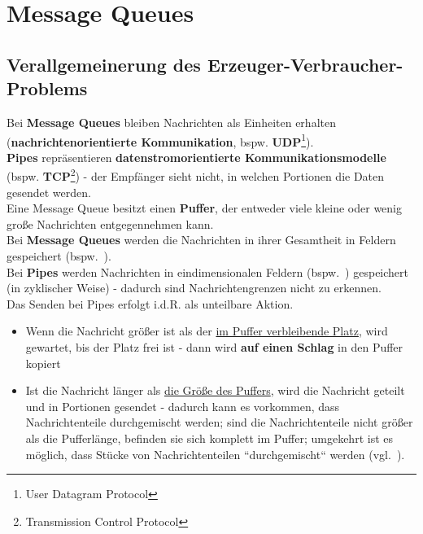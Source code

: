 \section{Message Queues}\label{sec:messagequeues}

\subsection{Verallgemeinerung des Erzeuger-Verbraucher-Problems}

Bei \textbf{Message Queues} bleiben Nachrichten als Einheiten erhalten (\textbf{nachrichtenorientierte Kommunikation}, bspw. \textbf{UDP}\footnote{User Datagram Protocol}).\\

\noindent
\textbf{Pipes} repräsentieren \textbf{datenstromorientierte Kommunikationsmodelle} (bspw. \textbf{TCP}\footnote{Transmission Control Protocol})  - der Empfänger sieht nicht, in welchen Portionen die Daten gesendet werden.\\

\noindent
Eine Message Queue besitzt einen \textbf{Puffer}, der entweder viele kleine oder wenig große Nachrichten entgegennehmen kann.\\

\noindent
Bei \textbf{Message Queues} werden die Nachrichten in ihrer Gesamtheit in Feldern gespeichert (bspw.~).\\

\noindent
Bei \textbf{Pipes} werden Nachrichten in eindimensionalen Feldern (bspw.~) gespeichert (in zyklischer Weise) - dadurch sind Nachrichtengrenzen nicht zu erkennen.\\

\noindent
Das Senden bei Pipes erfolgt i.d.R. als unteilbare Aktion.
\begin{itemize}
    \item Wenn die Nachricht größer ist als der \underline{im Puffer verbleibende Platz}, wird gewartet, bis der Platz frei ist - dann wird \textbf{auf einen Schlag} in den Puffer kopiert
    \item Ist die Nachricht länger als \underline{die Größe des Puffers}, wird die Nachricht geteilt und in Portionen gesendet - dadurch kann es vorkommen, dass Nachrichtenteile durchgemischt werden; sind die Nachrichtenteile nicht größer als die Pufferlänge, befinden sie sich komplett im Puffer;  umgekehrt ist es möglich, dass Stücke von Nachrichtenteilen ``durchgemischt`` werden (vgl.~\cite[117 f.]{Oec22}).
\end{itemize}

